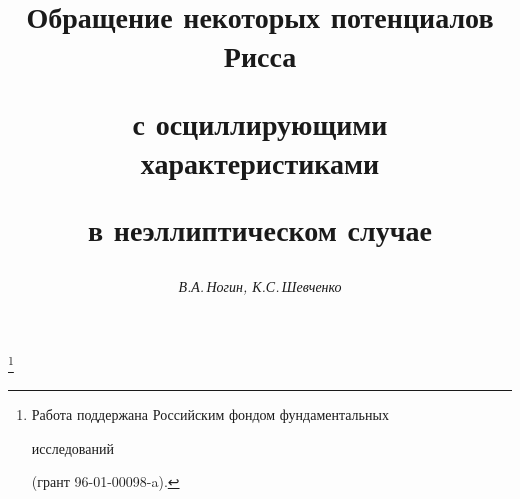 

 


%  


 


\newcommand{\re}{\operatorname{Re}} 


\newcommand{\tts}[1]{} 


 




\setcounter{page}{77} 












 


\author{\it В.А.\,Ногин, К.С.\,Шевченко} 




\title{Обращение некоторых потенциалов Рисса 


с осциллирующими характеристиками  


в неэллиптическом случае} 


\thanks{Работа поддержана Российским фондом фундаментальных 


исследований 


(грант 96-01-00098-a).} 


 


\date{} 




\pagestyle{plain} %


 




